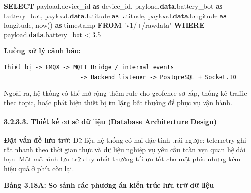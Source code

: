 \documentclass[13pt,a4paper]{extarticle}
\newenvironment{Shaded}{}{}
\newcommand{\DataTypeTok}[1]{\textcolor[rgb]{0.56,0.13,0.00}{#1}}
\newcommand{\FloatTok}[1]{\textcolor[rgb]{0.25,0.63,0.44}{#1}}
\newcommand{\KeywordTok}[1]{\textcolor[rgb]{0.00,0.44,0.13}{\textbf{#1}}}
\newcommand{\NormalTok}[1]{#1}
\newcommand{\OperatorTok}[1]{\textcolor[rgb]{0.40,0.40,0.40}{#1}}
\newcommand{\OtherTok}[1]{\textcolor[rgb]{0.00,0.44,0.13}{#1}}
\renewcommand{\\}{\thesislongtableorignewline\hline}%
\newcommand{\thesistabletitle}[1]{%
  \begin{center}\textbf{#1}\end{center}%
}
\begin{document}
\begin{Shaded}
\begin{Highlighting}[]
\KeywordTok{SELECT}
\NormalTok{  payload.device\_id }\KeywordTok{as}\NormalTok{ device\_id,}
\NormalTok{  payload.}\KeywordTok{data}\NormalTok{.battery\_bot }\KeywordTok{as}\NormalTok{ battery\_bot,}
\NormalTok{  payload.}\KeywordTok{data}\NormalTok{.latitude }\KeywordTok{as}\NormalTok{ latitude,}
\NormalTok{  payload.}\KeywordTok{data}\NormalTok{.longitude }\KeywordTok{as}\NormalTok{ longitude,}
\NormalTok{  now() }\KeywordTok{as} \DataTypeTok{timestamp}
\KeywordTok{FROM} \OtherTok{"v1/+/rawdata"}
\KeywordTok{WHERE}\NormalTok{ payload.}\KeywordTok{data}\NormalTok{.battery\_bot }\OperatorTok{\textless{}} \FloatTok{3.5}
\end{Highlighting}
\end{Shaded}

\textbf{Luồng xử lý cảnh báo:}

\begin{verbatim}
Thiết bị -> EMQX -> MQTT Bridge / internal events
                      -> Backend listener -> PostgreSQL + Socket.IO
\end{verbatim}

Ngoài ra, hệ thống có thể mở rộng thêm rule cho geofence sơ cấp, thống
kê traffic theo topic, hoặc phát hiện thiết bị im lặng bất thường để
phục vụ vận hành.

\paragraph{3.2.3.3. Thiết kế cơ sở dữ liệu (Database Architecture
Design)}\label{3233-thiux1ebft-kux1ebf-cux1a1-sux1edf-dux1eef-liux1ec7u-database-architecture-design}

\textbf{Đặt vấn đề lưu trữ:} Dữ liệu hệ thống có hai đặc tính trái
ngược: telemetry ghi rất nhanh theo thời gian thực và dữ liệu nghiệp vụ
yêu cầu toàn vẹn quan hệ dài hạn. Một mô hình lưu trữ duy nhất thường
tối ưu tốt cho một phía nhưng kém hiệu quả ở phía còn lại.

\thesistabletitle{Bảng 3.18A: So sánh các phương án kiến trúc lưu trữ dữ liệu}
\end{document}
